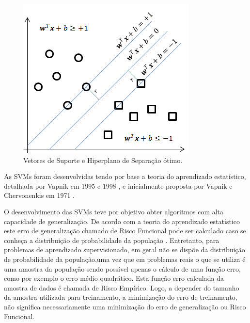 \begin{figure}[h]
	\centering 
	\includegraphics[width=.6\textwidth]{image/svm.png}
	\caption{Vetores de Suporte e Hiperplano de Separação ótimo.}
	\label{fig:svm}
\end{figure}

As SVMs foram desenvolvidas tendo por base a teoria do aprendizado estatístico, detalhada por Vapnik em 1995 e 1998 \cite{vapnikSnature} \cite{vapnik1998statistical}, e inicialmente proposta por Vapnik e Chervonenkis em 1971 \cite{vapnik1971uniform}.

O desenvolvimento das SVMs teve por objetivo obter algoritmos com alta capacidade de generalização. De acordo com a teoria do aprendizado estatístico este erro de generalização chamado de Risco Funcional pode ser calculado caso se conheça a distribuição de probabilidade da população \cite{vapnik1998statistical}. Entretanto, para problemas de aprendizado supervisionado, em geral não se dispõe da distribuição de probabilidade da população,uma vez que em problemas reais o que se utiliza é uma amostra da população sendo possível apenas o cálculo de uma função erro, como por exemplo o erro médio quadrático. Esta função erro calculada da amostra de dados é chamada de Risco Empírico. Logo, a depender do tamanho da amostra utilizada para treinamento, a minimização do erro de treinamento, não significa necessariamente uma minimização do erro de generalização ou Risco Funcional.

